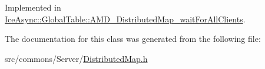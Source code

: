 Implemented in \hyperlink{class_ice_async_1_1_global_table_1_1_a_m_d___distributed_map__wait_for_all_clients_adfccfd863dbf495a0f821b1b02b0893e}{IceAsync::GlobalTable::AMD\_\-DistributedMap\_\-waitForAllClients}.



The documentation for this class was generated from the following file:\begin{DoxyCompactItemize}
\item 
src/commons/Server/\hyperlink{_distributed_map_8h}{DistributedMap.h}\end{DoxyCompactItemize}
